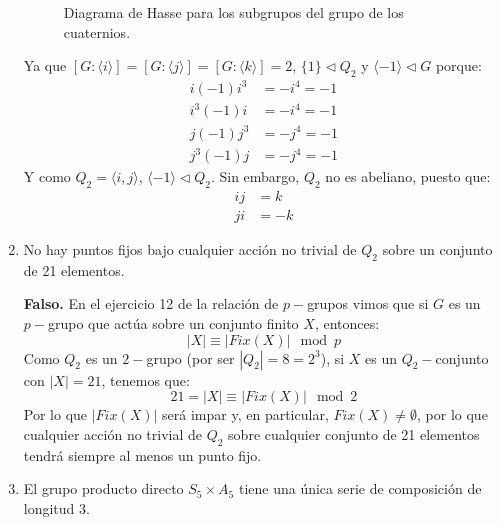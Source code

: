 \documentclass[12pt]{article}
\begin{document}
\begin{ejercicio}[5 puntos]
\begin{enumerate}
\begin{figure}[H]
                    \caption{Diagrama de Hasse para los subgrupos del grupo de los cuaternios.}
                \end{figure}
                Ya que $[G:\langle i \rangle ] = [G:\langle j \rangle ] = [G:\langle k \rangle ] = 2$, $\{1\}\lhd Q_2$ y $\langle -1 \rangle \lhd G $ porque:
                \begin{align*}
                    i(-1)i^3 &= -i^4 = -1 \\
                    i^3(-1)i &= -i^4 = -1 \\
                    j(-1)j^3 &= -j^4 = -1 \\
                    j^3(-1)j &= -j^4 = -1 
                \end{align*}
                Y como $Q_2 = \langle i,j \rangle $, $\langle -1 \rangle \lhd Q_2$. Sin embargo, $Q_2$ no es abeliano, puesto que:
                \begin{align*}
                    ij &= k \\
                    ji &= -k
                \end{align*}
            \item No hay puntos fijos bajo cualquier acción no trivial de $Q_2$ sobre un conjunto de 21 elementos.
                
                \textbf{Falso.} En el ejercicio 12 de la relación de $p-$grupos vimos que si $G$ es un $p-$grupo que actúa sobre un conjunto finito $X$, entonces:
                \begin{equation*}
                    |X| \equiv |Fix(X)| \mod p
                \end{equation*}
                Como $Q_2$ es un $2-$grupo (por ser $|Q_2| = 8 = 2^3$), si $X$ es un $Q_2-$conjunto con $|X| = 21$, tenemos que:
                \begin{equation*}
                    21 = |X| \equiv |Fix(X)| \mod 2
                \end{equation*}
                Por lo que $|Fix(X)|$ será impar y, en particular, $Fix(X)\neq \emptyset $, por lo que cualquier acción no trivial de $Q_2$ sobre cualquier conjunto de 21 elementos tendrá siempre al menos un punto fijo.
            \item El grupo producto directo $S_5\times A_5$ tiene una única serie de composición de longitud 3.


\end{enumerate}
\end{ejercicio}
\end{document}
